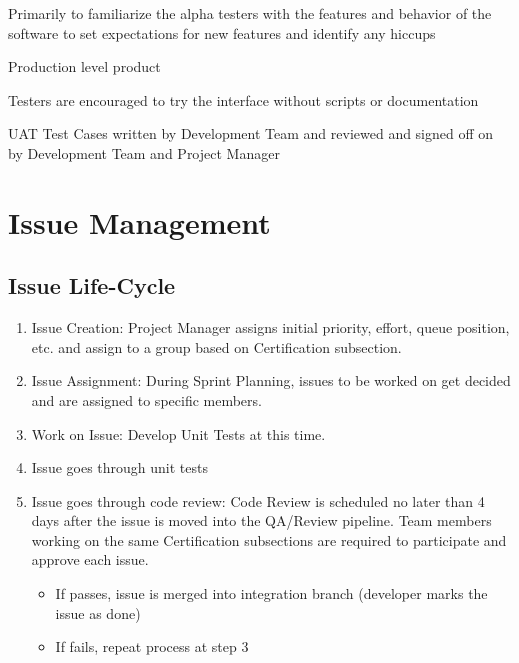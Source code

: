 \documentclass[letterpaper,10pt,english,openany,oneside]{sphinxmanual}
\let\sphinxpxdimen\pdfpxdimen\else\newdimen\sphinxpxdimen
\begin{document}
 Primarily to familiarize the alpha testers with the features and behavior of the software to set expectations for new features and identify any hiccups

 Production level product

 Testers are encouraged to try the interface without scripts or documentation

 UAT Test Cases written by Development Team and reviewed and signed off on by Development Team and Project Manager


\section{Issue Management}
\label{\detokenize{test_plan/issue_management:issue-management}}\label{\detokenize{test_plan/issue_management:id1}}\label{\detokenize{test_plan/issue_management::doc}}
\noindent\sphinxincludegraphics[width=600\sphinxpxdimen]{{issue_lifecycle}.png}


\subsection{Issue Life-Cycle}
\label{\detokenize{test_plan/issue_management:issue-life-cycle}}\begin{enumerate}
%
\item {} 
Issue Creation: Project Manager assigns initial priority, effort, queue position, etc. and assign to a group based on Certification subsection.

\item {} 
Issue Assignment: During Sprint Planning, issues to be worked on get decided and are assigned to specific members.

\item {} 
Work on Issue: Develop Unit Tests at this time.

\item {} 
Issue goes through unit tests

\item {} 
Issue goes through code review: Code Review is scheduled no later than 4 days after the issue is moved into the QA/Review pipeline. Team members working on the same Certification subsections are required to participate and approve each issue.
\begin{itemize}
\item {} 
If passes, issue is merged into integration branch (developer marks the issue as done)

\item {} 
If fails, repeat process at step 3

\end{itemize}

\end{enumerate}
\end{document}
